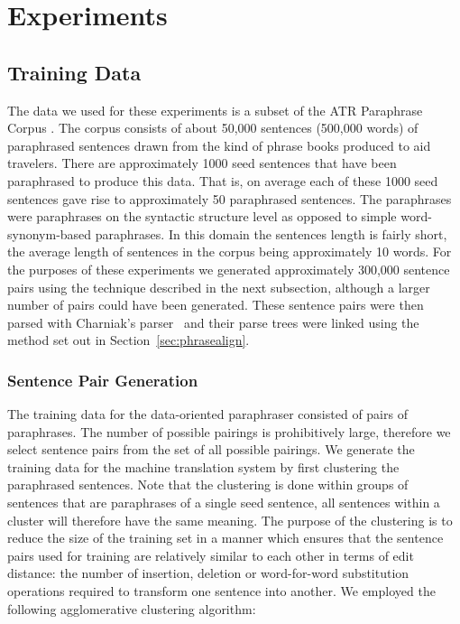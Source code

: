 \section{Experiments}
\label{sec:expt}

\subsection{Training Data}

The data we used for these experiments is a subset of the ATR Paraphrase
Corpus \cite{shimohara:fit2003}. The corpus consists of about
50,000 sentences (500,000 words) of paraphrased sentences drawn from the kind of
phrase books produced to aid travelers. There are
approximately 1000 seed sentences that have been paraphrased to produce this
data. That is, on average each of these 1000 seed sentences gave rise to approximately
50 paraphrased sentences. The paraphrases were paraphrases on the syntactic structure level
as opposed to simple word-synonym-based paraphrases. In this domain the sentences length is fairly
short, the average length of sentences in the corpus being approximately 10 words.
For the purposes of these experiments we generated 
approximately 300,000 sentence pairs using the technique described in the next subsection, 
although a larger number of pairs could have been generated. 
These sentence pairs were then parsed with Charniak's parser~\cite{charniak99maximumentropyinspired}
and their parse trees were linked using the method set out in Section~\ref{sec:phrasealign}.

\subsubsection{Sentence Pair Generation}
\label{sec:sentpair}

The training data for the data-oriented paraphraser consisted of pairs of paraphrases. The 
number of possible pairings is prohibitively large, therefore we select sentence pairs
from the set of all possible pairings. We generate the training data for the machine
translation system by first clustering the paraphrased sentences.  Note that the clustering is done within
groups of sentences that are paraphrases of a single seed sentence, all sentences within a cluster will therefore have the same meaning. 
The purpose of the clustering is to reduce the size of the training set in a manner which ensures 
that the sentence pairs used for training are relatively similar to each other
in terms of edit distance: the number of insertion, deletion or
word-for-word substitution operations required to transform one sentence into
another. We employed the following agglomerative clustering algorithm:

